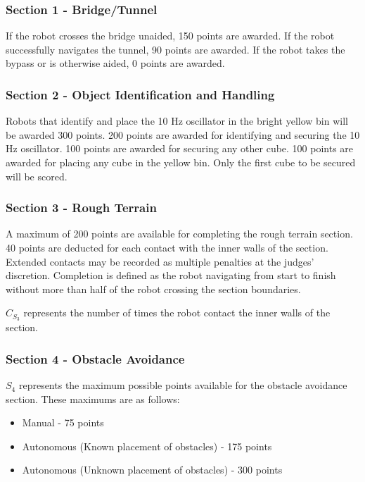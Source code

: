 \subsubsection{Section 1 - Bridge/Tunnel}
If the robot crosses the bridge unaided, 150 points are awarded. If the robot successfully navigates the tunnel, 90 points are awarded. If the robot takes the bypass or is otherwise aided, 0 points are awarded.

\subsubsection{Section 2 - Object Identification and Handling}

Robots that identify and place the 10 Hz oscillator in the bright yellow bin will be awarded 300 points. 200 points are awarded for identifying and securing the 10 Hz oscillator. 100 points are awarded for securing any other cube. 100 points are awarded for placing any cube in the yellow bin. Only the first cube to be secured will be scored. 

\subsubsection{Section 3 - Rough Terrain}
A maximum of 200 points are available for completing the rough terrain section. 40 points are deducted for each contact with the inner walls of the section. Extended contacts may be recorded as multiple penalties at the judges' discretion. Completion is defined as the robot navigating from start to finish without more than half of the robot crossing the section boundaries.

$C_{S_3}$ represents the number of times the robot contact the inner walls of the section.

\subsubsection{Section 4 - Obstacle Avoidance}
$S_4$ represents the maximum possible points available for the obstacle avoidance section. These maximums are as follows: 

\begin{itemize}
\item Manual - 75 points
\item Autonomous (Known placement of obstacles) - 175 points
\item Autonomous (Unknown placement of obstacles) - 300 points
\end{itemize}

